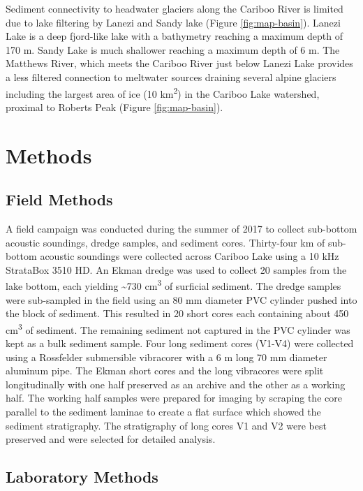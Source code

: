 \documentclass[Royal,times,doublespace,sageh]{sagej}
\begin{document}
Sediment connectivity to headwater glaciers along the Cariboo River is
limited due to lake filtering by Lanezi and Sandy lake (Figure
\ref{fig:map-basin}). Lanezi Lake is a deep fjord-like lake with a
bathymetry reaching a maximum depth of 170 m. Sandy Lake is much
shallower reaching a maximum depth of 6 m. The Matthews River, which
meets the Cariboo River just below Lanezi Lake provides a less filtered
connection to meltwater sources draining several alpine glaciers
including the largest area of ice (10 km\textsuperscript{2}) in the
Cariboo Lake watershed, proximal to Roberts Peak (Figure
\ref{fig:map-basin}).

\hypertarget{methods}{%
\section{Methods}\label{methods}}

\hypertarget{field-methods}{%
\subsection{Field Methods}\label{field-methods}}

A field campaign was conducted during the summer of 2017 to collect
sub-bottom acoustic soundings, dredge samples, and sediment cores.
Thirty-four km of sub-bottom acoustic soundings were collected across
Cariboo Lake using a 10 kHz StrataBox 3510 HD. An Ekman dredge was used
to collect 20 samples from the lake bottom, each yielding
\textasciitilde730 cm\textsuperscript{3} of surficial sediment. The
dredge samples were sub-sampled in the field using an 80 mm diameter PVC
cylinder pushed into the block of sediment. This resulted in 20 short
cores each containing about 450 cm\textsuperscript{3} of sediment. The
remaining sediment not captured in the PVC cylinder was kept as a bulk
sediment sample. Four long sediment cores (V1-V4) were collected using a
Rossfelder submersible vibracorer with a 6 m long 70 mm diameter
aluminum pipe. The Ekman short cores and the long vibracores were split
longitudinally with one half preserved as an archive and the other as a
working half. The working half samples were prepared for imaging by
scraping the core parallel to the sediment laminae to create a flat
surface which showed the sediment stratigraphy. The stratigraphy of long
cores V1 and V2 were best preserved and were selected for detailed
analysis.

\hypertarget{laboratory-methods}{%
\subsection{Laboratory Methods}\label{laboratory-methods}}
\end{document}
